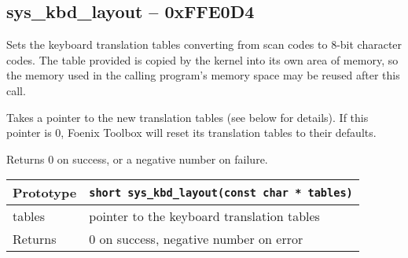 \subsection*{sys\_kbd\_layout -- 0xFFE0D4}
Sets the keyboard translation tables converting from scan codes to 8-bit character codes. The table provided is copied by the kernel into its own area of memory, so the memory used in the calling program's memory space may be reused after this call.

Takes a pointer to the new translation tables (see below for details). If this pointer is 0, Foenix Toolbox will reset its translation tables to their defaults.

Returns 0 on success, or a negative number on failure.

\bigskip

\begin{tabular}{|l||l|} \hline
Prototype & \lstinline!short sys_kbd_layout(const char * tables)! \\ \hline
tables & pointer to the keyboard translation tables \\ \hline
Returns & 0 on success, negative number on error \\ \hline
\end{tabular}
